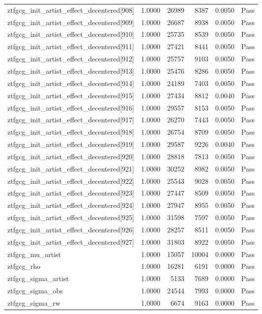 \begin{table}[htbp]
\begin{tabular}{llrrll}
ztfgcg\_init\_artist\_effect\_decentered[908] & 1.0000 & 26989 & 8387 & 0.0050 & Pass \\
ztfgcg\_init\_artist\_effect\_decentered[909] & 1.0000 & 26687 & 8938 & 0.0050 & Pass \\
ztfgcg\_init\_artist\_effect\_decentered[910] & 1.0000 & 25735 & 8539 & 0.0050 & Pass \\
ztfgcg\_init\_artist\_effect\_decentered[911] & 1.0000 & 27421 & 8441 & 0.0050 & Pass \\
ztfgcg\_init\_artist\_effect\_decentered[912] & 1.0000 & 25757 & 9103 & 0.0050 & Pass \\
ztfgcg\_init\_artist\_effect\_decentered[913] & 1.0000 & 25476 & 8286 & 0.0050 & Pass \\
ztfgcg\_init\_artist\_effect\_decentered[914] & 1.0000 & 24189 & 7403 & 0.0050 & Pass \\
ztfgcg\_init\_artist\_effect\_decentered[915] & 1.0000 & 27434 & 8812 & 0.0040 & Pass \\
ztfgcg\_init\_artist\_effect\_decentered[916] & 1.0000 & 29557 & 8153 & 0.0050 & Pass \\
ztfgcg\_init\_artist\_effect\_decentered[917] & 1.0000 & 26270 & 7443 & 0.0050 & Pass \\
ztfgcg\_init\_artist\_effect\_decentered[918] & 1.0000 & 26754 & 8709 & 0.0050 & Pass \\
ztfgcg\_init\_artist\_effect\_decentered[919] & 1.0000 & 29587 & 9226 & 0.0040 & Pass \\
ztfgcg\_init\_artist\_effect\_decentered[920] & 1.0000 & 28818 & 7813 & 0.0050 & Pass \\
ztfgcg\_init\_artist\_effect\_decentered[921] & 1.0000 & 30252 & 8982 & 0.0050 & Pass \\
ztfgcg\_init\_artist\_effect\_decentered[922] & 1.0000 & 25543 & 9028 & 0.0050 & Pass \\
ztfgcg\_init\_artist\_effect\_decentered[923] & 1.0000 & 27447 & 8509 & 0.0050 & Pass \\
ztfgcg\_init\_artist\_effect\_decentered[924] & 1.0000 & 27947 & 8955 & 0.0050 & Pass \\
ztfgcg\_init\_artist\_effect\_decentered[925] & 1.0000 & 31598 & 7597 & 0.0050 & Pass \\
ztfgcg\_init\_artist\_effect\_decentered[926] & 1.0000 & 28257 & 8511 & 0.0050 & Pass \\
ztfgcg\_init\_artist\_effect\_decentered[927] & 1.0000 & 31803 & 8922 & 0.0050 & Pass \\
ztfgcg\_mu\_artist & 1.0000 & 15057 & 10004 & 0.0000 & Pass \\
ztfgcg\_rho & 1.0000 & 16281 & 6191 & 0.0000 & Pass \\
ztfgcg\_sigma\_artist & 1.0000 & 5133 & 7689 & 0.0000 & Pass \\
ztfgcg\_sigma\_obs & 1.0000 & 24544 & 7993 & 0.0000 & Pass \\
ztfgcg\_sigma\_rw & 1.0000 & 6674 & 9163 & 0.0000 & Pass \\
\bottomrule
\end{tabular}
\end{table}
